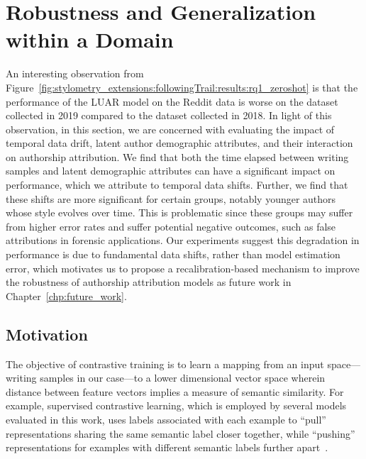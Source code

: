 \section{Robustness and Generalization within a Domain}

An interesting observation from Figure~\ref*{fig:stylometry_extensions:followingTrail:results:rq1_zeroshot} is that the performance of the LUAR model on the Reddit data is worse on the dataset collected in 2019 compared to the dataset collected in 2018.
In light of this observation, in this section, we are concerned with evaluating the impact of temporal data drift, latent author demographic attributes, and their interaction on authorship attribution.
We find that both the time elapsed between writing samples and latent demographic attributes can have a significant impact on performance, which we attribute to temporal data shifts.
Further, we find that these shifts are more significant for certain groups, notably younger authors whose style evolves over time.
This is problematic since these groups may suffer from higher error rates and suffer potential negative outcomes, such as false attributions in forensic applications.
Our experiments suggest this degradation in performance is due to fundamental data shifts, rather than model estimation error, which motivates us to propose a recalibration-based mechanism to improve the robustness of authorship attribution models as future work in Chapter~\ref{chp:future_work}.

\subsection{Motivation}

The objective of contrastive training is to learn a mapping from an input space---writing samples in our case---to a lower dimensional vector space wherein distance between feature vectors implies a measure of semantic similarity. 
For example, supervised contrastive learning, which is employed by several models evaluated in this work, uses labels associated with each example to ``pull'' representations sharing the same semantic label closer together, while ``pushing'' representations for examples with different semantic labels further apart~\cite{khosla2020supervised}. 

